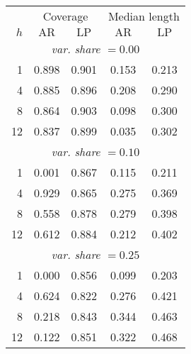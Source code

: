 \begin{tabular}{r|cc|cc}
& \multicolumn{2}{c|}{Coverage} & \multicolumn{2}{c}{Median length} \\
$h$ & $\text{AR}$ & $\text{LP}$ & $\text{AR}$ & $\text{LP}$ \\
\hline
\multicolumn{5}{c}{\emph{var. share $= 0.00$}} \\
  1 & 0.898 & 0.901 & 0.153 & 0.213 \\
  4 & 0.885 & 0.896 & 0.208 & 0.290 \\
  8 & 0.864 & 0.903 & 0.098 & 0.300 \\
 12 & 0.837 & 0.899 & 0.035 & 0.302 \\
\multicolumn{5}{c}{\emph{var. share $= 0.10$}} \\
  1 & 0.001 & 0.867 & 0.115 & 0.211 \\
  4 & 0.929 & 0.865 & 0.275 & 0.369 \\
  8 & 0.558 & 0.878 & 0.279 & 0.398 \\
 12 & 0.612 & 0.884 & 0.212 & 0.402 \\
\multicolumn{5}{c}{\emph{var. share $= 0.25$}} \\
  1 & 0.000 & 0.856 & 0.099 & 0.203 \\
  4 & 0.624 & 0.822 & 0.276 & 0.421 \\
  8 & 0.218 & 0.843 & 0.344 & 0.463 \\
 12 & 0.122 & 0.851 & 0.322 & 0.468 \\
\end{tabular}